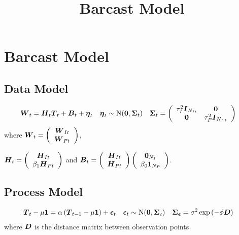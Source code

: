 \documentclass{article}\usepackage[]{graphicx}\usepackage[]{color}
\title{Barcast Model}
\def\bm#1{\mbox{\boldmath $#1$}}
\begin{document}
\maketitle
%
%
\section{Barcast Model}
%
%
\subsection{Data Model}
%
\begin{align*}
%
\bm{W}_t & = \bm{H}_t \bm{T}_t + \bm{B}_t + \bm{\eta}_t & \bm{\eta}_t & \sim \mbox{N}(\bm{0}, \bm{\Sigma}_t) & \bm{\Sigma}_t & = \left( \begin{array}{cc} \tau_I^2 \bm{I}_{N_{It}} & \bm{0}\\ \bm{0} & \tau_P^2 \bm{I}_{N_{Pt}} \end{array} \right)
%
\end{align*}
%
where $\bm{W}_t = \left( \begin{array}{c} \bm{W}_{It} \\ \bm{W}_{Pt} \end{array} \right)$, 

$\bm{H}_t = \left( \begin{array}{c} \bm{H}_{It}\\ \beta_1 \bm{H}_{Pt} \end{array} \right)$ and $\bm{B}_t = \left( \begin{array}{c} \bm{H}_{It}\\ \bm{H}_{Pt} \end{array} \right) \left( \begin{array}{c} \bm{0}_{N_I}\\ \beta_0 \bm{1}_{N_P} \end{array} \right)$.
%
%
\subsection{Process Model}
%
\begin{align*}
\bm{T}_t - \mu \bm{1} & = \alpha \left( \bm{T}_{t - 1} - \mu \bm{1} \right) + \bm{\epsilon}_t  & \bm{\epsilon}_t & \sim \mbox{N}(\bm{0}, \bm{\Sigma}_\epsilon) & \bm{\Sigma_\epsilon} & = \sigma^2 \exp{\left( - \phi \bm{D} \right)}
\end{align*}
%
where $\bm{D}$ is the distance matrix between observation points
%
%
\end{document}
